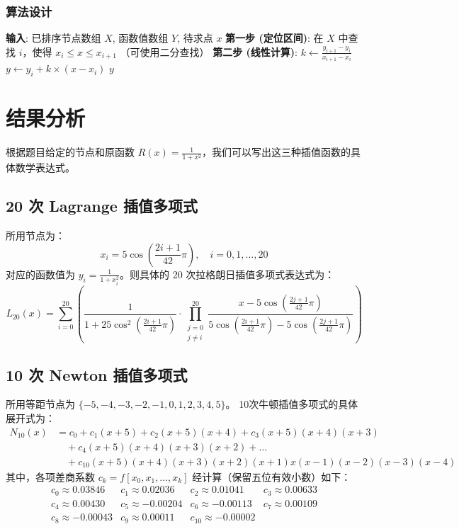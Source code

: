 \documentclass{article}
\begin{document}
\subsubsection{算法设计}
\begin{algorithm}[H]
\caption{计算分段线性插值函数}
\begin{algorithmic}[1]
    \STATE \textbf{输入}: 已排序节点数组 $X$, 函数值数组 $Y$, 待求点 $x$
    \STATE \textbf{第一步 (定位区间)}: 
    \STATE 在 $X$ 中查找 $i$，使得 $x_i \le x \le x_{i+1}$ （可使用二分查找）
    \STATE \textbf{第二步 (线性计算)}:
    \STATE $k \leftarrow \frac{y_{i+1} - y_i}{x_{i+1} - x_i}$
    \STATE $y \leftarrow y_i + k \times (x - x_i)$
    \RETURN $y$
\end{algorithmic}
\end{algorithm}

\section{结果分析}
根据题目给定的节点和原函数 $R(x)=\frac{1}{1+x^2}$，我们可以写出这三种插值函数的具体数学表达式。
\subsection{20 次 Lagrange 插值多项式}
所用节点为：
\[ x_i = 5\cos\left(\frac{2i+1}{42}\pi\right), \quad i = 0, 1, \dots, 20 \]
对应的函数值为 $y_i = \frac{1}{1+x_i^2}$。则具体的 20 次拉格朗日插值多项式表达式为：
\begin{equation}
L_{20}(x) = \sum_{i=0}^{20} \left( \frac{1}{1 + 25\cos^2\left(\frac{2i+1}{42}\pi\right)} \cdot \prod_{\substack{j=0 \\ j \neq i}}^{20} \frac{x - 5\cos\left(\frac{2j+1}{42}\pi\right)}{5\cos\left(\frac{2i+1}{42}\pi\right) - 5\cos\left(\frac{2j+1}{42}\pi\right)} \right)
\end{equation}

\subsection{10 次 Newton 插值多项式}
所用等距节点为 $\{-5, -4, -3, -2, -1, 0, 1, 2, 3, 4, 5\}$。
10次牛顿插值多项式的具体展开式为：
\begin{equation}
\begin{aligned}
N_{10}(x) &= c_0 + c_1(x+5) + c_2(x+5)(x+4) + c_3(x+5)(x+4)(x+3) \\
&\quad + c_4(x+5)(x+4)(x+3)(x+2) + \dots \\
&\quad + c_{10}(x+5)(x+4)(x+3)(x+2)(x+1)x(x-1)(x-2)(x-3)(x-4)
\end{aligned}
\end{equation}
其中，各项差商系数 $c_k = f[x_0, x_1, \dots, x_k]$ 经计算（保留五位有效小数）如下：
\[
\begin{array}{llll}
c_0 \approx 0.03846 & c_1 \approx 0.02036 & c_2 \approx 0.01041 & c_3 \approx 0.00633 \\
c_4 \approx 0.00430 & c_5 \approx -0.00204 & c_6 \approx -0.00113 & c_7 \approx 0.00109 \\
c_8 \approx -0.00043 & c_9 \approx 0.00011 & c_{10} \approx -0.00002 & 
\end{array}
\]
\end{document}

